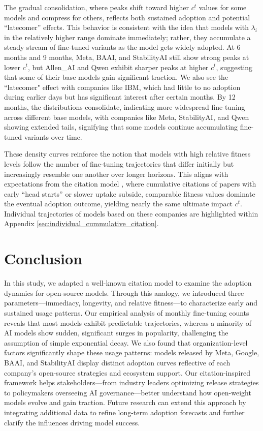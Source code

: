 \documentclass{article} %
\begin{document}
        The gradual consolidation, where peaks shift toward higher $c^t$ values for some models and compress for others, reflects both sustained adoption and potential “latecomer” effects. This behavior is consistent with the idea that models with $\lambda_i$ in the relatively higher range dominate immediately; rather, they accumulate a steady stream of fine‐tuned variants as the model gets widely adopted.  At 6 months and 9 months, Meta, BAAI, and StabilityAI still show strong peaks at lower $c^t$, but Allen\_AI and Qwen exhibit sharper peaks at higher $c^t$, suggesting that some of their base models gain significant traction. We also see the ``latecomer" effect with companies like IBM, which had little to no adoption during earlier days but has significant interest after certain months. By 12 months, the distributions consolidate, indicating more widespread fine-tuning across different base models, with companies like Meta, StabilityAI, and Qwen showing extended tails, signifying that some models continue accumulating fine-tuned variants over time.
        
        These density curves reinforce the notion that models with high relative fitness levels follow the number of fine-tuning trajectories that differ initially but increasingly resemble one another over longer horizons. This aligns with expectations from the citation model \cite{wangQuantifyingLongTermScientific2013}, where cumulative citations of papers with early “head starts” or slower uptake subside, comparable fitness values dominate the eventual adoption outcome, yielding nearly the same ultimate impact $c^t$. Individual trajectories of models based on these companies are highlighted within Appendix \ref{sec:individual_cummulative_citation}.
    \section{Conclusion}
        In this study, we adapted a well-known citation model to examine the adoption dynamics for open-source models. Through this analogy, we introduced three parameters—immediacy, longevity, and relative fitness—to characterize early and sustained usage patterns. Our empirical analysis of monthly fine-tuning counts reveals that most models exhibit predictable trajectories, whereas a minority of AI models show sudden, significant surges in popularity, challenging the assumption of simple exponential decay. We also found that organization-level factors significantly shape these usage patterns: models released by Meta, Google, BAAI, and StabilityAI display distinct adoption curves reflective of each company’s open-source strategies and ecosystem support. Our citation-inspired framework helps stakeholders—from industry leaders optimizing release strategies to policymakers overseeing AI governance—better understand how open-weight models evolve and gain traction. Future research can extend this approach by integrating additional data to refine long-term adoption forecasts and further clarify the influences driving model success.
        
\end{document}
